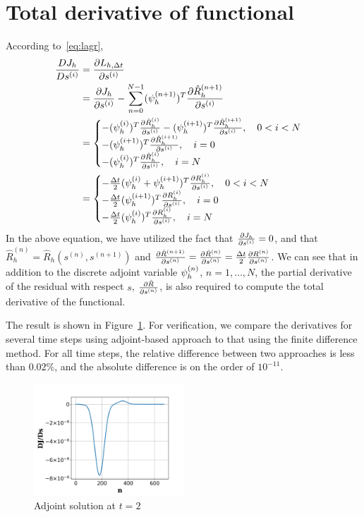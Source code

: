 \documentclass[a4paper]{article}
\begin{document}
\section{Total derivative of functional} \label{sec:total_deriv}
According to~\eqref{eq:lagr},
\begin{equation}
\begin{aligned}
\frac{D J_h}{D s^{(i)}} &= \frac{\partial {L_{h,\Delta t}}}{\partial{s^{(i)}}} \\
&= \frac{\partial {J_h}}{\partial{s^{(i)}}} - \sum_{n=0}^{N-1}(\psi_h^{(n+1)})^T \frac{\partial {\hat{R}_h^{(n+1)}}}{\partial{s^{(i)}}} \\
&=\begin{cases}
- (\psi_h^{(i)})^T \frac{\partial {\hat{R}_h^{(i)}}}{\partial{s^{(i)}}} - (\psi_h^{(i+1)})^T \frac{\partial {\hat{R}_h^{(i+1)}}}{\partial{s^{(i)}}}, \quad 0<i<N \\
- (\psi_h^{(i+1)})^T \frac{\partial {\hat{R}_h^{(i+1)}}}{\partial{s^{(i)}}}, \quad i=0 \\
- (\psi_h^{(i)})^T \frac{\partial {\hat{R}_h^{(i)}}}{\partial{s^{(i)}}} ,\quad i=N
\end{cases}\\
&=\begin{cases}
- \frac{\Delta t}{2}(\psi_h^{(i)}+\psi_h^{(i+1)})^T \frac{\partial {R_h^{(i)}}}{\partial{s^{(i)}}}, \quad 0<i<N \\
- \frac{\Delta t}{2}(\psi_h^{(i+1)})^T \frac{\partial {{R}_h^{(i)}}}{\partial{s^{(i)}}}, \quad i=0 \\
- \frac{\Delta t}{2}(\psi_h^{(i)})^T \frac{\partial {{R}_h^{(i)}}}{\partial{s^{(i)}}} ,\quad i=N
\end{cases}
\end{aligned}
\end{equation}
In the above equation, we have utilized the fact that $\frac{\partial {J_h}}{\partial{s^{(i)}}}=0$, and that $\hat{R}_h^{(n)} = \hat{R}_h(s^{(n)}, s^{(n+1)})$ and $\frac{\partial {\hat{R}^{(n+1)}}}{\partial{s^{(n)}}} = \frac{\partial {\hat{R}^{(n)}}}{\partial{s^{(n)}}} = \frac{\Delta t}{2}\frac{\partial {R^{(n)}}}{\partial{s^{(n)}}}$.
We can see that in addition to the discrete adjoint variable $\psi_h^{(n)}$, $n=1, \dots, N$, the partial derivative of the residual with respect $s$,  $\frac{\partial {\hat{R}}}{\partial{s^{(n)}}}$, is also required to compute the total derivative of the functional.

The result is shown in Figure~\ref{fig:dJdS}. For verification, we compare the derivatives for several time steps using adjoint-based approach to that using the finite difference method. For all time steps, the relative difference between two approaches is less than $0.02\%$, and the absolute difference is on the order of $10^{-11}$.
\begin{figure}
  \centering
  \includegraphics[width=0.5\textwidth]{figures/totdJdS.png}
  \caption{Adjoint solution at $t=2$}
  \label{fig:dJdS}
\end{figure}
\end{document}
